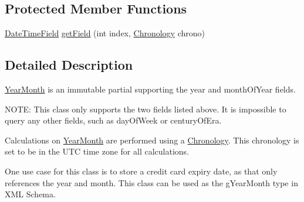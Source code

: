 \subsection*{Protected Member Functions}
\begin{DoxyCompactItemize}
\item 
\hyperlink{classorg_1_1joda_1_1time_1_1_date_time_field}{Date\-Time\-Field} \hyperlink{classorg_1_1joda_1_1time_1_1_year_month_ad2503730142d48f134db471ba30360ae}{get\-Field} (int index, \hyperlink{classorg_1_1joda_1_1time_1_1_chronology}{Chronology} chrono)
\end{DoxyCompactItemize}


\subsection{Detailed Description}
\hyperlink{classorg_1_1joda_1_1time_1_1_year_month}{Year\-Month} is an immutable partial supporting the year and month\-Of\-Year fields. 

N\-O\-T\-E\-: This class only supports the two fields listed above. It is impossible to query any other fields, such as day\-Of\-Week or century\-Of\-Era. 

Calculations on \hyperlink{classorg_1_1joda_1_1time_1_1_year_month}{Year\-Month} are performed using a \hyperlink{classorg_1_1joda_1_1time_1_1_chronology}{Chronology}. This chronology is set to be in the U\-T\-C time zone for all calculations. 

One use case for this class is to store a credit card expiry date, as that only references the year and month. This class can be used as the g\-Year\-Month type in X\-M\-L Schema. 

